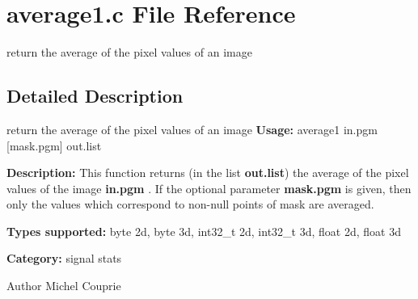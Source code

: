 \section{average1.c File Reference}
\label{average1_8c}


return the average of the pixel values of an image  




\subsection{Detailed Description}
return the average of the pixel values of an image {\bfseries Usage:} average1 in.pgm [mask.pgm] out.list

{\bfseries Description:} This function returns (in the list {\bfseries out.list}) the average of the pixel values of the image {\bfseries in.pgm} . If the optional parameter {\bfseries mask.pgm} is given, then only the values which correspond to non-\/null points of mask are averaged.

{\bfseries Types supported:} byte 2d, byte 3d, int32\_\-t 2d, int32\_\-t 3d, float 2d, float 3d

{\bfseries Category:} signal stats

\begin{DoxyAuthor}{Author}
Michel Couprie 
\end{DoxyAuthor}
